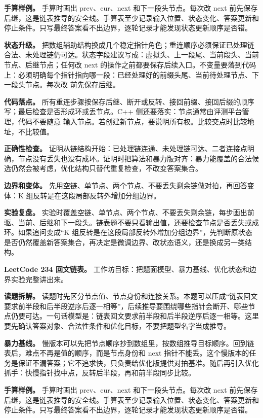 \textbf{手算样例。} 手算时画出 prev、cur、next 和下一段头节点。每次改 next 前先保存后继，这是链表推导的安全线。手算表至少记录输入位置、状态变化、答案更新和停止条件。只写最终答案看不出边界，逐轮记录才能发现状态更新顺序是否错。

\textbf{状态升级。} 把数组辅助结构换成几个稳定指针角色；重连顺序必须保证已处理链合法、未处理链仍可达。状态字段建议写成：虚拟头、上一段尾、当前段头、当前节点、后继节点；任何改 next 的操作之前都要保存后续入口。不变量要落到代码上：必须明确每个指针指向哪一段：已经处理好的前缀头尾、当前待处理节点、下一段头节点。每次改  前先保存后继。

\textbf{代码落点。} 所有重连步骤按保存后继、断开或反转、接回前缀、接回后缀的顺序写；最后检查是否形成环或丢节点。C++ 侧还要落实：节点通常由评测平台管理，代码不要随意  输入节点。若创建新节点，要说明所有权。比较交点时比较地址，不比较值。

\textbf{正确性检查。} 证明从链结构开始：已处理链连通、未处理链可达、二者连接点明确，节点没有丢失也没有成环。证明时把算法和暴力版对齐：暴力能覆盖的合法候选仍然会被考虑，优化结构只替代重复检查，不改变答案集合。

\textbf{边界和变体。} 先用空链、单节点、两个节点、不要丢失剩余链做对拍，再回答变体：K 组反转是在这段局部反转外增加分组边界。

\textbf{实验复盘。} 实验时覆盖空链、单节点、两个节点、不要丢失剩余链，每步画出前驱、当前、后继和下一段头。链表题不要只看输出值，还要检查节点是否丢失或成环。如果追问变成“K 组反转是在这段局部反转外增加分组边界”，先判断原状态是否仍然覆盖新答案集合，再决定是微调边界、改状态语义，还是换成另一类结构。

\noindent\textbf{LeetCode 234 回文链表。} 工作坊目标：把题面模型、暴力基线、优化状态和边界实验完整讲出来。

\textbf{读题拆解。} 读题时先区分节点值、节点身份和连接关系。本题可以压成“链表回文要求前半段和后半段逆序后逐一相等”，后续推导要围绕哪些指针会断开、哪些节点仍要可达。一句话模型是：链表回文要求前半段和后半段逆序后逐一相等。这里要先确认答案对象、合法性条件和优化目标，不要把题型名字当成推导。

\textbf{暴力基线。} 慢版本可以先把节点顺序抄到数组里，按数组推导目标顺序。回到链表后，难点不再是值的顺序，而是节点身份和 next 指针不能丢。这个慢版本的任务是保证不漏答案；它不追求快，只负责给优化版提供对拍基准。随后再引入优化抓手：快慢指针找中点，反转后半段，再和前半段同步比较。

\textbf{手算样例。} 手算时画出 prev、cur、next 和下一段头节点。每次改 next 前先保存后继，这是链表推导的安全线。手算表至少记录输入位置、状态变化、答案更新和停止条件。只写最终答案看不出边界，逐轮记录才能发现状态更新顺序是否错。

